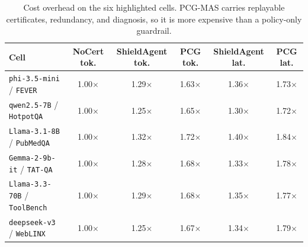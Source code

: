 \begin{table}[!ht]
\centering
\caption{\small Cost overhead on the six highlighted cells. PCG-MAS carries replayable certificates, redundancy, and diagnosis, so it is more expensive than a policy-only guardrail.}
\label{tab:cost_overhead_main}
\scriptsize
\begin{tabular}{l|ccc|cc}
\toprule
Cell & NoCert tok. & ShieldAgent tok. & PCG tok. & ShieldAgent lat. & PCG lat. \\
\midrule
\texttt{phi-3.5-mini} / \texttt{FEVER} & 1.00$\times$ & 1.29$\times$ & 1.63$\times$ & 1.36$\times$ & 1.73$\times$ \\
\texttt{qwen2.5-7B} / \texttt{HotpotQA} & 1.00$\times$ & 1.25$\times$ & 1.65$\times$ & 1.30$\times$ & 1.72$\times$ \\
\texttt{Llama-3.1-8B} / \texttt{PubMedQA} & 1.00$\times$ & 1.32$\times$ & 1.72$\times$ & 1.40$\times$ & 1.84$\times$ \\
\texttt{Gemma-2-9b-it} / \texttt{TAT-QA} & 1.00$\times$ & 1.28$\times$ & 1.68$\times$ & 1.33$\times$ & 1.78$\times$ \\
\texttt{Llama-3.3-70B} / \texttt{ToolBench} & 1.00$\times$ & 1.29$\times$ & 1.68$\times$ & 1.35$\times$ & 1.77$\times$ \\
\texttt{deepseek-v3} / \texttt{WebLINX} & 1.00$\times$ & 1.25$\times$ & 1.67$\times$ & 1.34$\times$ & 1.79$\times$ \\
\bottomrule
\end{tabular}
\end{table}
